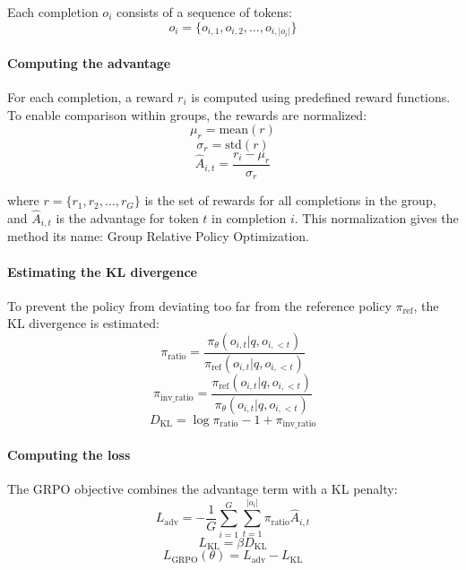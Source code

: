 Each completion $o_i$ consists of a sequence of tokens:
\begin{equation}
o_i = \{o_{i,1}, o_{i,2}, \ldots, o_{i,|o_i|}\}
\end{equation}

\paragraph{Computing the advantage} For each completion, a reward $r_i$ is computed using predefined reward functions. To enable comparison within groups, the rewards are normalized:
\begin{equation}
\mu_r = \text{mean}(r)
\end{equation}
\begin{equation}
\sigma_r = \text{std}(r)
\end{equation}
\begin{equation}
\hat{A}_{i,t} = \frac{r_i - \mu_r}{\sigma_r}
\end{equation}

where $r = \{r_1, r_2, \ldots, r_G\}$ is the set of rewards for all completions in the group, and $\hat{A}_{i,t}$ is the advantage for token $t$ in completion $i$. This normalization gives the method its name: Group Relative Policy Optimization.

\paragraph{Estimating the KL divergence} To prevent the policy from deviating too far from the reference policy $\pi_{\text{ref}}$, the KL divergence is estimated:
\begin{equation}
\pi_\text{ratio} = \frac{\pi_\theta(o_{i,t} | q, o_{i,<t})}{\pi_{\text{ref}}(o_{i,t} | q, o_{i,<t})}
\end{equation}
\begin{equation}
\pi_\text{inv\_ratio} = \frac{\pi_{\text{ref}}(o_{i,t} | q, o_{i,<t})}{\pi_\theta(o_{i,t} | q, o_{i,<t})}
\end{equation}
\begin{equation}
D_{\text{KL}} = \log\pi_\text{ratio} - 1 + \pi_\text{inv\_ratio}
\end{equation}

\paragraph{Computing the loss} The GRPO objective combines the advantage term with a KL penalty:
\begin{equation}
L_{\text{adv}} = -\frac{1}{G}\sum_{i=1}^{G}\sum_{t=1}^{|o_i|}\pi_\text{ratio}\hat{A}_{i,t}
\end{equation}
\begin{equation}
L_{\text{KL}} = \beta D_{\text{KL}}
\end{equation}
\begin{equation}
L_{\text{GRPO}}(\theta) = L_{\text{adv}} - L_{\text{KL}}
\end{equation}

